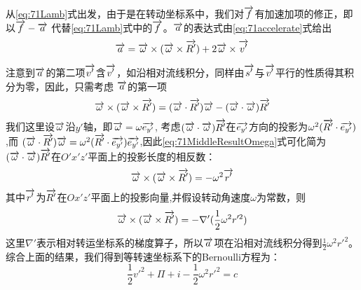 从\eqref{eq:71Lamb}式出发，由于是在转动坐标系中，我们对$\v{f}$有加速加项的修正，即以$\v{f}-\v{a}$
代替\eqref{eq:71Lamb}式中的$\v{f}$。$\v{a}$的表达式由\eqref{eq:71accelerate}式给出
\begin{equation}\label{eq:71accelerate}
\v{a}=\v{\omega}\times(\v{\omega}\times\v{R'})+2\v{\omega}\times\v{v'}
\end{equation}

注意到$\v{a}$的第二项$\v{v'}$含$\v{v'}$，如沿相对流线积分，同样由$\v{s'}$与$\v{v'}$平行的性质得其积分为零，因此，只需考虑
$\v{a}$的第一项
\begin{equation}\label{eq:71MiddleResultOmega}
\v{\omega}\times(\v{\omega}\times\v{R'}) = (\v{\omega}\cdot \v{R'})\v{\omega}-(\v{\omega}\cdot \v{\omega})\v{R'}
\end{equation}
我们这里设$\v{\omega}$沿$y'$轴，即$\v{\omega}=\omega \v{e_{y'}}$,
考虑$(\v{\omega}\cdot \v{\omega})\v{R'}$在$\v{e_{y'}}$方向的投影为$\omega^2(\v{R'}\cdot \v{e_{y'}})$,而
$(\v{\omega}\cdot \v{R'})\v{\omega}=\omega^2(\v{R'}\cdot \v{e_{y'}})\v{e_{y'}}$,因此\eqref{eq:71MiddleResultOmega}式可化简为
$(\v{\omega}\cdot \v{\omega})\v{R'}$在$O'x'z'$平面上的投影长度的相反数：
\begin{equation}
\v{\omega}\times(\v{\omega}\times\v{R'})=-\omega^2 \v{r'}
\end{equation}
其中$\v{r'}$为$\v{R'}$在$Ox'z'$平面上的投影向量,并假设转动角速度$\omega$为常数，则
\begin{equation}
\v{\omega}\times(\v{\omega}\times\v{R'})=-\nabla' (\frac{1}{2}\omega^2 r'^2)
\end{equation}
这里$\nabla'$表示相对转运坐标系的梯度算子，所以$\v{a}$项在沿相对流线积分得到$\frac{1}{2}\omega^2 r'^2$。
综合上面的结果，我们得到等转速坐标系下的Bernoulli方程为：
\begin{equation}
\frac{1}{2}v'^2+\Pi+i-\frac{1}{2}\omega^2 r'^2 = c
\end{equation}
\begin{equation}
\end{equation}
\begin{equation}
\end{equation}
